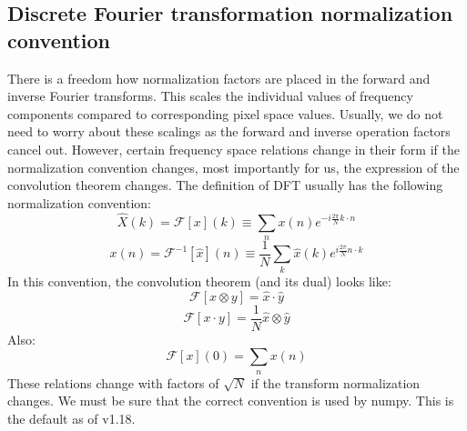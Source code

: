 \subsection{Discrete Fourier transformation normalization convention}
\par There is a freedom how normalization factors are placed in the
forward and inverse Fourier transforms.  This scales the individual
values of frequency components compared to corresponding pixel space
values. Usually, we do not need to worry about these scalings as the
forward and inverse operation factors cancel out. However, certain
frequency space relations change in their form if the normalization
convention changes, most importantly for us, the expression of the
convolution theorem changes.
%
The definition of DFT usually has the following normalization convention:
\begin{equation}
\hat{X}(k) = \mathcal{F}[x](k) \equiv \sum_n x(n) e^{-i\frac{2\pi}{N}k\cdot n}
\end{equation}
%
\begin{equation}
x(n) = \mathcal{F}^{-1}[\hat{x}](n) \equiv \frac{1}{N}\sum_k \hat{x}(k)
  e^{i\frac{2\pi}{N}n\cdot k}
\end{equation}
In this convention, the convolution theorem (and its dual) looks like:
\begin{equation}
\mathcal{F}[x \otimes y] =  \hat{x} \cdot \hat{y}
\end{equation}
\begin{equation}
\mathcal{F}[x\cdot y] = \frac{1}{N} \hat{x} \otimes \hat{y}
\end{equation}
Also:
\begin{equation}
\mathcal{F}[x](0) = \sum_n x(n)
\label{eq:X0sum}
\end{equation}
These relations change with factors of $\sqrt{N}$ if the transform
normalization changes. We must be sure that the correct convention is used
by numpy. This is the default as of v1.18.
%

